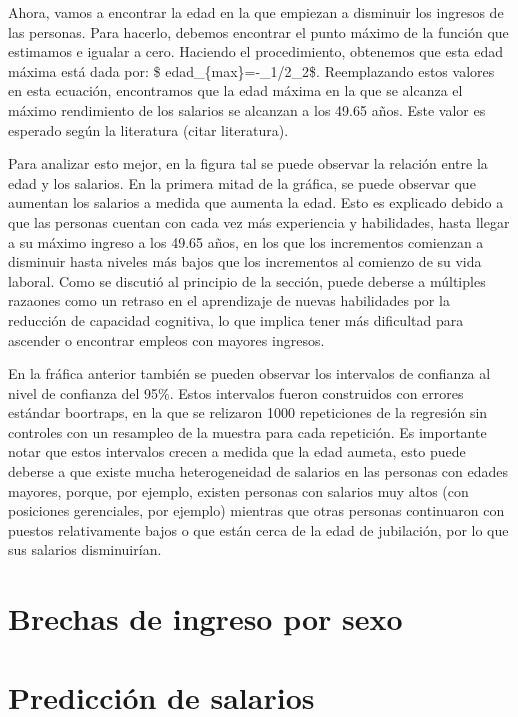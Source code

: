 \documentclass[
  11pt,
  letterpaper,
]{article}
\begin{document}
Ahora, vamos a encontrar la edad en la que empiezan a disminuir los
ingresos de las personas. Para hacerlo, debemos encontrar el punto
máximo de la función que estimamos e igualar a cero. Haciendo el
procedimiento, obtenemos que esta edad máxima está dada por: \$
edad\_\{max\}=-\beta\_1/2\beta\_2\$. Reemplazando estos valores en esta
ecuación, encontramos que la edad máxima en la que se alcanza el máximo
rendimiento de los salarios se alcanzan a los 49.65 años. Este valor es
esperado según la literatura (citar literatura).

Para analizar esto mejor, en la figura tal se puede observar la relación
entre la edad y los salarios. En la primera mitad de la gráfica, se
puede observar que aumentan los salarios a medida que aumenta la edad.
Esto es explicado debido a que las personas cuentan con cada vez más
experiencia y habilidades, hasta llegar a su máximo ingreso a los 49.65
años, en los que los incrementos comienzan a disminuir hasta niveles más
bajos que los incrementos al comienzo de su vida laboral. Como se
discutió al principio de la sección, puede deberse a múltiples razaones
como un retraso en el aprendizaje de nuevas habilidades por la reducción
de capacidad cognitiva, lo que implica tener más dificultad para
ascender o encontrar empleos con mayores ingresos.

En la fráfica anterior también se pueden observar los intervalos de
confianza al nivel de confianza del 95\%. Estos intervalos fueron
construidos con errores estándar boortraps, en la que se relizaron 1000
repeticiones de la regresión sin controles con un resampleo de la
muestra para cada repetición. Es importante notar que estos intervalos
crecen a medida que la edad aumeta, esto puede deberse a que existe
mucha heterogeneidad de salarios en las personas con edades mayores,
porque, por ejemplo, existen personas con salarios muy altos (con
posiciones gerenciales, por ejemplo) mientras que otras personas
continuaron con puestos relativamente bajos o que están cerca de la edad
de jubilación, por lo que sus salarios disminuirían.

\hypertarget{brechas-de-ingreso-por-sexo}{%
\section{Brechas de ingreso por
sexo}\label{brechas-de-ingreso-por-sexo}}

\hypertarget{predicciuxf3n-de-salarios}{%
\section{Predicción de salarios}\label{predicciuxf3n-de-salarios}}
\end{document}
